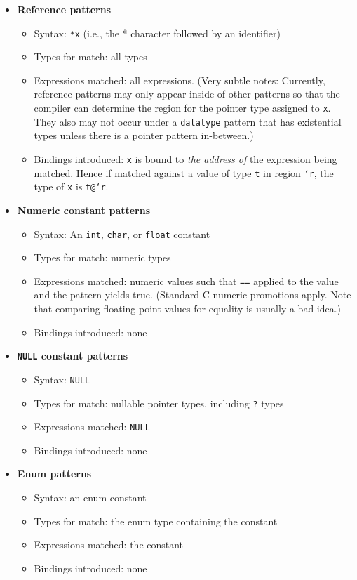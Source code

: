 \begin{itemize}
\item \textbf{Reference patterns}
  \begin{itemize}
  \item Syntax: \texttt{*x} (i.e., the * character followed by an
    identifier)
  \item Types for match: all types
  \item Expressions matched: all expressions.  (Very subtle notes: Currently,
    reference patterns may only appear inside of other patterns so
    that the compiler can determine the region for the pointer type
    assigned to \texttt{x}.  They also may not occur under a
  \texttt{datatype} pattern that has existential types unless there is a
  pointer pattern in-between.)
  \item Bindings introduced: \texttt{x} is bound to \emph{the address of}
    the expression being matched.  Hence if matched against a value
    of type \texttt{t} in region \texttt{`r}, the type of \texttt{x} is
    \texttt{t@`r}. 
  \end{itemize}
  
\item \textbf{Numeric constant patterns}
  \begin{itemize}
  \item Syntax: An \texttt{int}, \texttt{char}, or \texttt{float} constant
  \item Types for match: numeric types
  \item Expressions matched: numeric values such that \texttt{==}
    applied to the value and the pattern yields true.  (Standard C
    numeric promotions apply.  Note that comparing floating point
    values for equality is usually a bad idea.)
  \item Bindings introduced: none
  \end{itemize}
  
\item \textbf{\texttt{NULL} constant patterns}
  \begin{itemize}
  \item Syntax: \texttt{NULL}
  \item Types for match: nullable pointer types, including \texttt{?} types
  \item Expressions matched: \texttt{NULL}
  \item Bindings introduced: none
  \end{itemize}
  
\item \textbf{Enum patterns}
  \begin{itemize}
  \item Syntax: an enum constant
  \item Types for match: the enum type containing the constant
  \item Expressions matched: the constant
  \item Bindings introduced: none
  \end{itemize}
  

\end{itemize}
